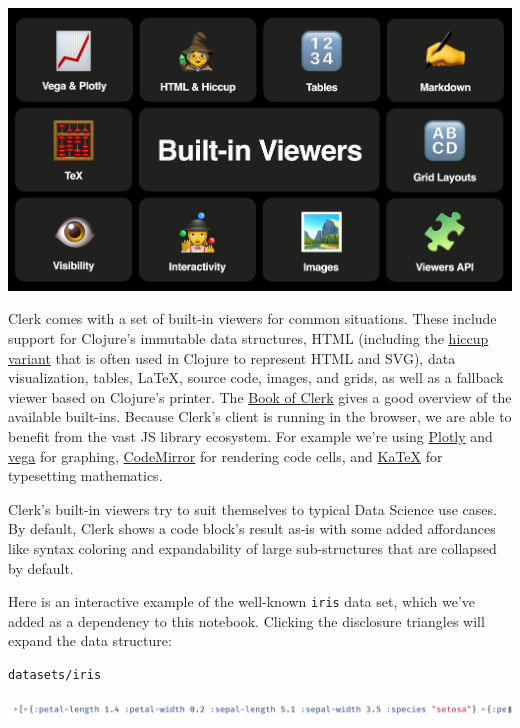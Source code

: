 \documentclass[sigconf,screen]{acmart}
\newcommand{\passthrough}[1]{#1}
\begin{document}
\includegraphics{images/built-in-viewers.png}

Clerk comes with a set of built-in viewers for common situations. These include support for Clojure's immutable data structures, HTML (including the \href{https://github.com/weavejester/hiccup}{hiccup variant} that is often used in Clojure to represent HTML and SVG), data visualization, tables, LaTeX, source code, images, and grids, as well as a fallback viewer based on Clojure's printer. The \href{https://book.clerk.vision}{Book of Clerk} gives a good overview of the available built-ins. Because Clerk's client is running in the browser, we are able to benefit from the vast JS library ecosystem. For example we're using \href{https://plotly.com/javascript/}{Plotly} and \href{https://github.com/vega/vega-embed}{vega} for graphing, \href{https://codemirror.net}{CodeMirror} for rendering code cells, and \href{https://katex.org}{KaTeX} for typesetting mathematics.

Clerk's built-in viewers try to suit themselves to typical Data Science use cases. By default, Clerk shows a code block's result as-is with some added affordances like syntax coloring and expandability of large sub-structures that are collapsed by default.

Here is an interactive example of the well-known \passthrough{\lstinline!iris!} data set, which we've added as a dependency to this notebook. Clicking the disclosure triangles will expand the data structure:

\begin{lstlisting}
datasets/iris
\end{lstlisting}

\includegraphics{images/anon-expr-5dtc44qrw3zUvpTfiAXJDH7mtADdRT-result.png}
\end{document}
